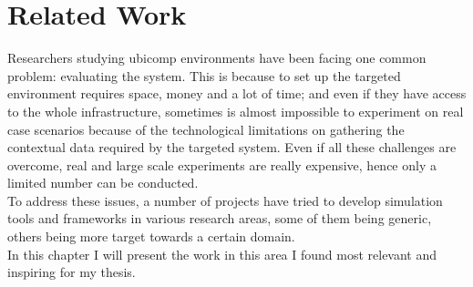 \chapter{Related Work}\label{ch:related_work}

Researchers studying ubicomp environments have been facing one common problem: evaluating the system. This is because to set up the targeted environment requires space, money and a lot of time; and even if they have access to the whole infrastructure, sometimes is almost impossible to experiment on real case scenarios because of the technological limitations on gathering the contextual data required by the targeted system. Even if all these challenges are overcome, real and large scale experiments are really expensive, hence only a limited number can be conducted.\\

To address these issues, a number of projects have tried to develop simulation tools and frameworks in various research areas, some of them being generic, others being more target towards a certain domain.\\

In this chapter I will present the work in this area I found most relevant and inspiring for my thesis.













